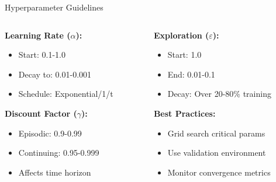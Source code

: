 \documentclass[aspectratio=169,10pt]{beamer}
\begin{document}
\begin{frame}{Hyperparameter Guidelines}
\begin{columns}[T]
\begin{column}{0.5\textwidth}
\textbf{Learning Rate ($\alpha$):}
\begin{itemize}
    \item Start: 0.1-1.0
    \item Decay to: 0.01-0.001
    \item Schedule: Exponential/1/t
\end{itemize}

\textbf{Discount Factor ($\gamma$):}
\begin{itemize}
    \item Episodic: 0.9-0.99
    \item Continuing: 0.95-0.999
    \item Affects time horizon
\end{itemize}
\end{column}
\begin{column}{0.5\textwidth}
\textbf{Exploration ($\varepsilon$):}
\begin{itemize}
    \item Start: 1.0
    \item End: 0.01-0.1
    \item Decay: Over 20-80\% training
\end{itemize}

\textbf{Best Practices:}
\begin{itemize}
    \item Grid search critical params
    \item Use validation environment
    \item Monitor convergence metrics
\end{itemize}
\end{column}
\end{columns}
\end{frame}
\end{document}
